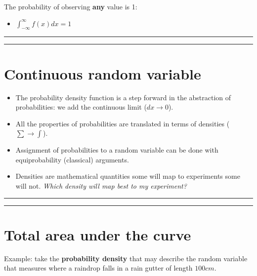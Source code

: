 \documentclass[
]{book}
\providecommand{\tightlist}{%
  \setlength{\itemsep}{0pt}\setlength{\parskip}{0pt}}
\begin{document}
The probability of observing \textbf{any} value is 1:

\begin{itemize}
\tightlist
\item
  \(\int_{-\infty}^{\infty} f(x) dx = 1\)
\end{itemize}

\begin{center}\rule{0.5\linewidth}{0.5pt}\end{center}

\begin{center}\rule{0.5\linewidth}{0.5pt}\end{center}

\hypertarget{continuous-random-variable-4}{%
\section{Continuous random variable}\label{continuous-random-variable-4}}

\begin{itemize}
\item
  The probability density function is a step forward in the abstraction of probabilities: we add the continuous limit (\(dx \rightarrow 0\)).
\item
  All the properties of probabilities are translated in terms of densities (\(\sum \rightarrow \int\)).
\item
  Assignment of probabilities to a random variable can be done with equiprobability (classical) arguments.
\item
  Densities are mathematical quantities some will map to experiments some will not. \emph{Which density will map best to my experiment?}
\end{itemize}

\begin{center}\rule{0.5\linewidth}{0.5pt}\end{center}

\begin{center}\rule{0.5\linewidth}{0.5pt}\end{center}

\hypertarget{total-area-under-the-curve}{%
\section{Total area under the curve}\label{total-area-under-the-curve}}

Example: take the \textbf{probability density} that may describe the random variable that measures where a raindrop falls in a rain gutter of length \(100cm\).
\end{document}
